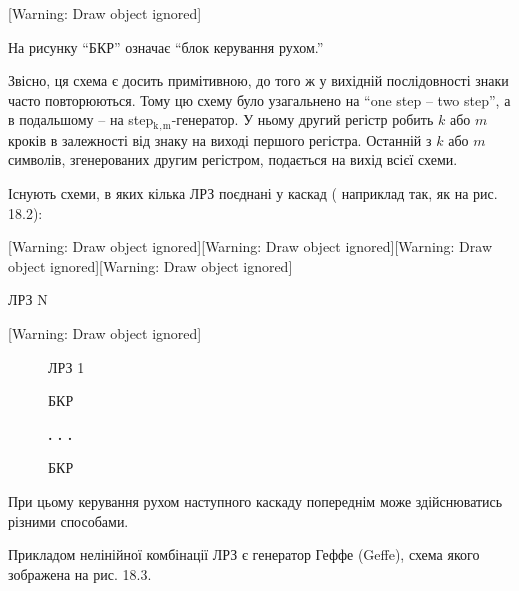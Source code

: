 \documentclass[a4paper]{article}
\newcommand\textsubscript[1]{\ensuremath{{}_{\text{#1}}}}
\newcounter{}
\begin{document}
[Warning: Draw object ignored]

На рисунку “БКР” означає “блок керування рухом.”

Звісно, ця схема є досить примітивною, до того ж у вихідній послідовності знаки
часто повторюються. Тому цю схему було узагальнено на “one step – two step”, а
в подальшому – на 
step\textsubscript{k}\textsubscript{,}\textsubscript{m}{}-генератор. У ньому
другий регістр робить  ${k}$ або  ${m}$ кроків в залежності від знаку на виході
першого регістра. Останній з  ${k}$ або  ${m}$ символів, згенерованих другим
регістром, подається на вихід всієї схеми.

Існують схеми, в яких кілька ЛРЗ поєднані у каскад ( наприклад так, як на рис.
18.2):


\bigskip

[Warning: Draw object ignored][Warning: Draw object ignored][Warning: Draw
object ignored][Warning: Draw object ignored]\begin{minipage}{1.0098in}

\bigskip
\end{minipage}\begin{minipage}{1.0091in}
 ЛРЗ N
\end{minipage}[Warning: Draw object ignored]

\begin{figure}
\centering
\begin{minipage}{1.0098in}
 ЛРЗ 1
\end{minipage}
\end{figure}
\begin{figure}
\centering
\begin{minipage}{0.5299in}
БКР
\end{minipage}
\end{figure}
\begin{figure}
\centering
\begin{minipage}{0.5083in}
{\bfseries
. . .}
\end{minipage}
\end{figure}
\begin{figure}
\centering
\begin{minipage}{0.5299in}
БКР
\end{minipage}
\end{figure}
При цьому керування рухом наступного каскаду попереднім може здійснюватись
різними способами. 

Прикладом нелінійної комбінації ЛРЗ є генератор Геффе (Geffe), схема якого
зображена на рис. 18.3. 
\end{document}
